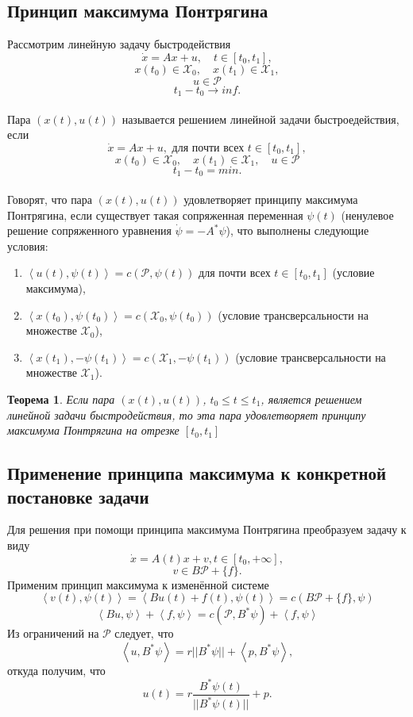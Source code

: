 \documentclass{article}
\begin{document}
\subsection{Принцип максимума Понтрягина}

    Рассмотрим линейную задачу быстродействия
    $$\dot x = Ax + u, \quad t \in [t_0, t_1], $$
    $${x(t_0) \in \mathcal{X}_0},\quad {x(t_1) \in \mathcal{X}_1},$$
    $$u \in \mathcal{P}$$
    $${t_1-t_0 \to inf}.$$
\\[5pt]
    Пара ${(x(t), u(t))}$ называется решением линейной задачи быстроедействия, если
    $$\dot x = Ax + u, \mbox{ для почти всех } t \in [t_0, t_1], $$
    $${x(t_0) \in \mathcal{X}_0},\quad {x(t_1) \in \mathcal{X}_1},\quad u \in \mathcal{P}$$
    $$ {t_1-t_0 = min}.$$
\\[5pt]
    Говорят, что пара ${(x(t), u(t))}$ удовлетворяет принципу максимума Понтрягина, если существует такая сопряженная переменная $\psi(t)$ (ненулевое решение сопряженного уравнения $\dot\psi = -A^*\psi$), что выполнены следующие условия:
    \begin{enumerate}
        \item ${\left<u(t), \psi(t)\right> = c(\mathcal{P}, \psi(t))}$ для почти всех ${t \in [t_0, t_1]}$ (условие максимума),
        \item ${\left<x(t_0), \psi(t_0)\right> = c(\mathcal{X}_0, \psi(t_0))}$ (условие трансверсальности на множестве $\mathcal{X}_0$),
        \item ${\left<x(t_1), -\psi(t_1)\right> = c(\mathcal{X}_1, -\psi(t_1))}$ (условие трансверсальности на множестве $\mathcal{X}_1$).
    \end{enumerate}
    \newtheorem{theor}{Теорема}
    \begin{theor}
         Если пара ${(x(t), u(t))}$, ${t_0 \leq t \leq t_1}$, является решением линейной задачи быстродействия, то эта пара удовлетворяет принципу максимума Понтрягина на отрезке $[t_0, t_1]$
    \end{theor}
\subsection{Применение принципа максимума к конкретной постановке задачи}
    Для решения при помощи принципа максимума Понтрягина преобразуем задачу к виду
    $$ \dot x = A(t)x+v, t \in [t_0, +\infty],$$
    $$ v \in B\mathcal{P} + \{f\}.$$
    Применим принцип максимума к изменённой системе
    $${\left<v(t), \psi(t)\right> = \left<Bu(t) + f(t), \psi(t)\right> = c(B\mathcal{P} + \{f\}, \psi)}$$
    $${\left<Bu, \psi\right> + \left<f, \psi\right> = c(\mathcal{P}, B^*\psi) + \left<f, \psi\right>}$$
    Из ограничений на ${\mathcal{P}}$ следует, что
    $${ \left<u, B^*\psi\right> = r||B^*\psi|| + \left<p, B^*\psi\right>,}$$
    откуда получим, что
     $$   u(t) = r\frac{B^*\psi(t)}{||B^*\psi(t)||} + p.$$
\end{document}

